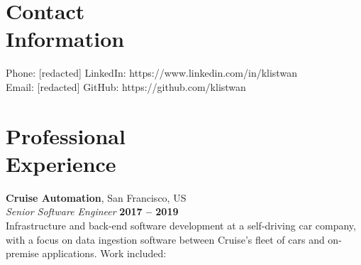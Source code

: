 \documentclass[margin,line]{resume}
\begin{document}
\begin{resume}
    \section{\mysidestyle Contact\\Information}

    Phone: [redacted]       \hfill LinkedIn: https://www.linkedin.com/in/klistwan \\
    \noindent Email: [redacted]  \hfill GitHub: https://github.com/klistwan \vspace{0mm}\\\vspace{-4.5mm}

    \section{\mysidestyle Professional\\Experience}

    \textbf{Cruise Automation}, San Francisco, US \vspace{1mm}\\\vspace{1mm}%
    \textsl{Senior Software Engineer} \hfill \textbf{2017 -- 2019}\\
    Infrastructure and back-end software development at a self-driving car company, with a focus on data ingestion software between Cruise's fleet of cars and on-premise applications. Work included:
    \vspace{-2mm}


\end{resume}
\end{document}
